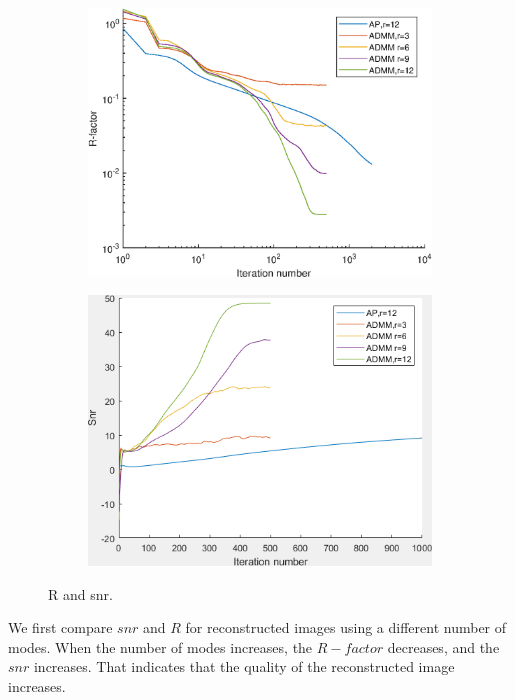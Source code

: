\documentclass{article}
\numberwithin{equation}{section}
\begin{document}
 \begin{figure}[H]
 \begin{subfigure}{.5\textwidth}
    \centering
    \includegraphics[width=0.9\linewidth]{../figures/modes_R.eps}  
    \label{fig:modes_R}
 \end{subfigure}
 \begin{subfigure}{.5\textwidth}
    \centering
    \includegraphics[width=.9\linewidth]{../figures/modes_snr.png}  
    \label{fig:modes_snr}
 \end{subfigure}
 \caption{R and snr. }
 \label{fig:noise}
 \end{figure}


We first compare $snr$ and $R$ for reconstructed images using a different number of modes. When the number of modes increases, the $R-factor$ decreases, and the $snr$ increases. That indicates that the quality of the reconstructed image increases.
\end{document}
